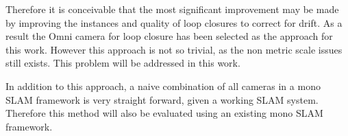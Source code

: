 Therefore it is conceivable that the most significant improvement may be made by improving the instances and quality of loop closures to correct for drift.  As a result the Omni camera for loop closure has been selected as the approach for this work.  However this approach is not so trivial, as the non metric scale issues still exists.  This problem will be addressed in this work.

In addition to this approach, a naive combination of all cameras in a mono SLAM framework is very straight forward, given a working SLAM system.  Therefore this method will also be evaluated using an existing mono SLAM framework.
